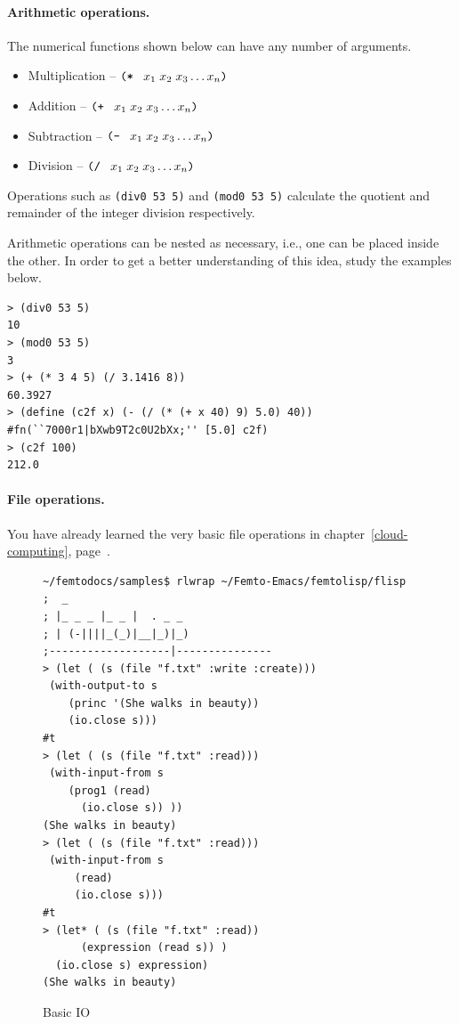 \documentclass[a4paper,12pt]{book}
\newenvironment{fmpage}[1]
           {\begin{lrbox}{\fmbox}\begin{minipage}{#1}}
           {\end{minipage}\end{lrbox}\fbox{\usebox{\fmbox}}}
\begin{document}
\paragraph{Arithmetic operations.} The numerical functions
shown below can have any number of arguments.
\begin{itemize}
\item Multiplication -- $\verb|(* |\;x_1\; x_2\; x_3\ldots x_n\verb|)|$
\item Addition -- $\verb|(+ |\;x_1\; x_2\; x_3\ldots x_n\verb|)|$
\item Subtraction -- $\verb|(- |\;x_1\; x_2\; x_3\ldots x_n\verb|)|$
\item Division -- $\verb|(/ |\;x_1\; x_2\; x_3\ldots x_n\verb|)|$
\end{itemize}
Operations such as \verb|(div0 53 5)| and \verb|(mod0 53 5)|
calculate the quotient and remainder of the integer
division respectively. 

Arithmetic operations can
be nested as necessary, i.e., one
 can be placed inside the other.
In order to get a better understanding
of this idea, study the examples below.
\begin{Verbatim}[fontsize=\small,
frame=single]
> (div0 53 5)
10
> (mod0 53 5)
3
> (+ (* 3 4 5) (/ 3.1416 8))
60.3927
> (define (c2f x) (- (/ (* (+ x 40) 9) 5.0) 40))
#fn(``7000r1|bXwb9T2c0U2bXx;'' [5.0] c2f)
> (c2f 100)
212.0
\end{Verbatim}

\paragraph{File operations.}
You have already learned the very basic
file operations in chapter~\ref{cloud-computing},
page~\pageref{cloud-computing}.\\

\begin{figure}[!h]
\begin{fmpage}{0.95\textwidth}
\begin{verbatim}
~/femtodocs/samples$ rlwrap ~/Femto-Emacs/femtolisp/flisp
;  _
; |_ _ _ |_ _ |  . _ _
; | (-||||_(_)|__|_)|_)
;-------------------|---------------
> (let ( (s (file "f.txt" :write :create)))
 (with-output-to s
    (princ '(She walks in beauty))
    (io.close s)))
#t
> (let ( (s (file "f.txt" :read)))
 (with-input-from s
    (prog1 (read)
      (io.close s)) ))
(She walks in beauty)
> (let ( (s (file "f.txt" :read)))
 (with-input-from s
     (read)
     (io.close s)))
#t
> (let* ( (s (file "f.txt" :read))
      (expression (read s)) )
  (io.close s) expression)
(She walks in beauty)
\end{verbatim}
\end{fmpage}
\caption{Basic IO}
\label{basicio}
\end{figure}
\end{document}
